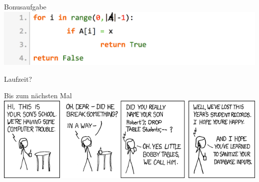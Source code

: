 \documentclass[18pt]{beamer}
\begin{document}
	\begin{frame}{Bonusaufgabe}
		\includegraphics[align=center, scale=0.25]{pics/pseudocode02.png}
		


		Laufzeit?	
	\end{frame}

	\begin{frame}{Bis zum nächsten Mal}
		\includegraphics[align=center, scale=0.5]{pics/exploits_of_a_mom.png}
	\end{frame}
\end{document}
